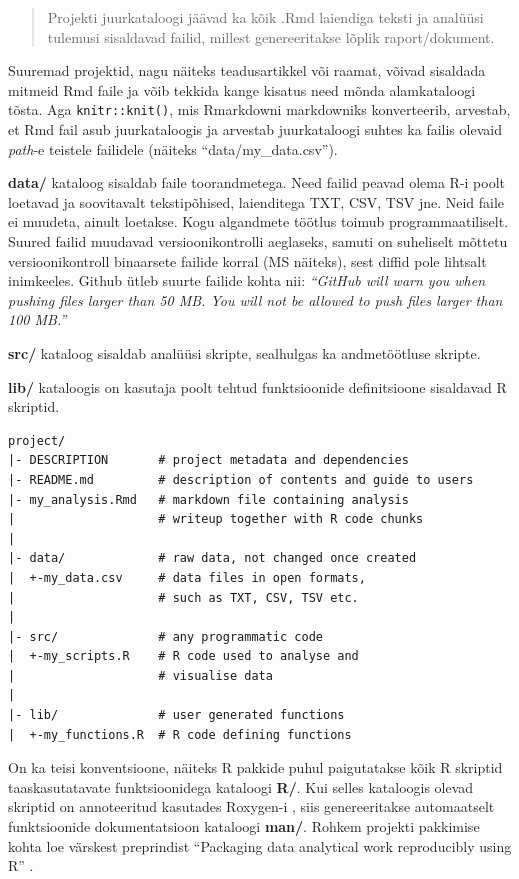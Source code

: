 \documentclass[]{book}
\begin{document}
\begin{quote}
Projekti juurkataloogi jäävad ka kõik .Rmd laiendiga teksti ja analüüsi
tulemusi sisaldavad failid, millest genereeritakse lõplik
raport/dokument.
\end{quote}

Suuremad projektid, nagu näiteks teadusartikkel või raamat, võivad
sisaldada mitmeid Rmd faile ja võib tekkida kange kisatus need mõnda
alamkataloogi tõsta. Aga \texttt{knitr::knit()}, mis Rmarkdowni
markdowniks konverteerib, arvestab, et Rmd fail asub juurkataloogis ja
arvestab juurkataloogi suhtes ka failis olevaid \emph{path}-e teistele
failidele (näiteks ``data/my\_data.csv'').

\textbf{data/} kataloog sisaldab faile toorandmetega. Need failid peavad
olema R-i poolt loetavad ja soovitavalt tekstipõhised, laienditega TXT,
CSV, TSV jne. Neid faile ei muudeta, ainult loetakse. Kogu algandmete
töötlus toimub programmaatiliselt. Suured failid muudavad
versioonikontrolli aeglaseks, samuti on suheliselt mõttetu
versioonikontroll binaarsete failide korral (MS näiteks), sest diffid
pole lihtsalt inimkeeles. Github ütleb suurte failide kohta nii:
\emph{``GitHub will warn you when pushing files larger than 50 MB. You
will not be allowed to push files larger than 100 MB.''}

\textbf{src/} kataloog sisaldab analüüsi skripte, sealhulgas ka
andmetöötluse skripte.

\textbf{lib/} kataloogis on kasutaja poolt tehtud funktsioonide
definitsioone sisaldavad R skriptid.

\begin{verbatim}
project/
|- DESCRIPTION       # project metadata and dependencies
|- README.md         # description of contents and guide to users
|- my_analysis.Rmd   # markdown file containing analysis
|                    # writeup together with R code chunks
|
|- data/             # raw data, not changed once created 
|  +-my_data.csv     # data files in open formats, 
|                    # such as TXT, CSV, TSV etc.
|
|- src/              # any programmatic code
|  +-my_scripts.R    # R code used to analyse and 
|                    # visualise data
|
|- lib/              # user generated functions
|  +-my_functions.R  # R code defining functions
\end{verbatim}

On ka teisi konventsioone, näiteks R pakkide puhul paigutatakse kõik R
skriptid taaskasutatavate funktsioonidega kataloogi \textbf{R/}. Kui
selles kataloogis olevad skriptid on annoteeritud kasutades Roxygen-i
\citep{roxygen2}, siis genereeritakse automaatselt funktsioonide
dokumentatsioon kataloogi \textbf{man/}. Rohkem projekti pakkimise kohta
loe värskest preprindist ``Packaging data analytical work reproducibly
using R'' \citep{marwick2017}.
\end{document}
